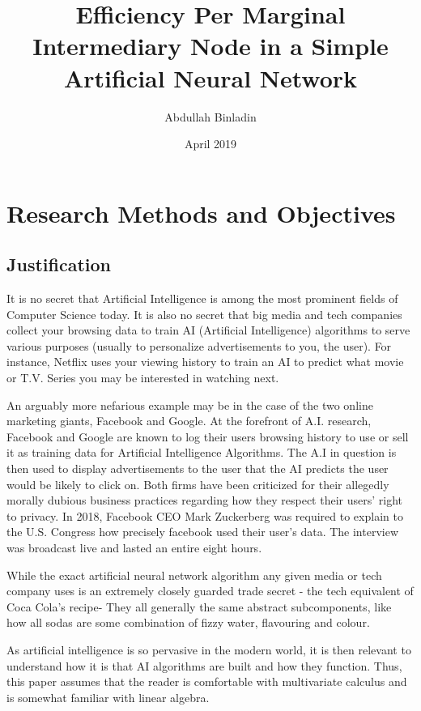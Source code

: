 \documentclass[12pt]{article}
\title{Efficiency Per Marginal Intermediary Node in a Simple Artificial Neural Network}
\author{Abdullah Binladin}
\date{April 2019}
\begin{document}
\maketitle

\tableofcontents
\pagebreak

\section{Research Methods and Objectives}

\subsection{Justification\label{history}}

It is no secret that Artificial Intelligence is among the most prominent fields of Computer Science today. It is also no secret that big media and tech
companies collect your browsing data to train AI (Artificial Intelligence) algorithms to serve various purposes (usually to personalize advertisements to you, the user). For instance, Netflix uses your viewing history to train an AI to predict what movie or T.V. Series you may be interested in watching next.

An arguably more nefarious example may be in the case of the two online marketing giants, Facebook and Google. At the forefront of A.I. research, Facebook and Google are known to log their users browsing history to use or sell it as training data for Artificial Intelligence Algorithms. The A.I in question is then used to display advertisements to the user that the AI predicts the user would be likely to click on. Both firms have been criticized for their allegedly morally dubious business practices regarding how they respect their users' right to privacy. In 2018, Facebook CEO Mark Zuckerberg was required to explain to the U.S. Congress how precisely facebook used their user's data. The interview was broadcast live and lasted an entire eight hours.

While the exact artificial neural network algorithm any given media or tech company uses is an extremely closely guarded trade secret - the tech equivalent of Coca Cola's recipe- They all generally the same abstract subcomponents, like how all sodas are some combination of fizzy water, flavouring and colour.

As artificial intelligence is so pervasive in the modern world, it is then relevant to understand how it is that AI algorithms are built and how they function. Thus, this paper assumes that the reader is comfortable with multivariate calculus and is somewhat familiar with linear algebra.
\end{document}
